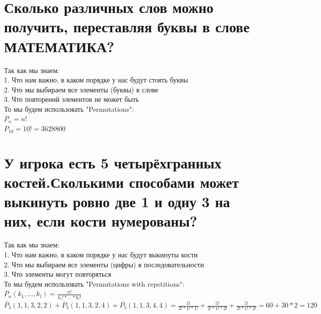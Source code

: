\documentclass{article}
\begin{document}
    \section{Сколько различных слов можно получить, переставляя буквы в слове МАТЕМАТИКА?}
        Так как мы знаем:\\
        1. Что нам важно, в каком порядке у нас будут стоять буквы\\
        2. Что мы выбираем все элементы (буквы) в слове\\
        3. Что повторений элементов не может быть\\
        То мы будем использовать "Permutations":\\
        $ P_n = n! $\\
        $ P_{10} = 10! = 3628800 $
    \section{У игрока есть 5 четырёхгранных костей.Сколькими способами может выкинуть ровно две 1 и одну 3 на них, если кости нумерованы?}
        Так как мы знаем:\\
        1. Что нам важно, в каком порядке у нас будут выкинуты кости\\
        2. Что мы выбираем все элементы (цифры) в последовательности\\
        3. Что элементы могут повторяться\\
        То мы будем использовать "Permutations with repetitions":\\
        $ \overline{P_n} (k_1, ..., k_l) = \frac{n!}{k_1!*...*k_l!} $\\
        $ \overline{P_5} (1,1,3,2,2) + \overline{P_5} (1,1,3,2,4) + \overline{P_5} (1,1,3,4,4) = \frac{5!}{2!*1!*1!} + \frac{5!}{2!*1!*2!} + \frac{5!}{2!*1!*2!} = 60 + 30 * 2 = 120 $
        \newpage
\end{document}
